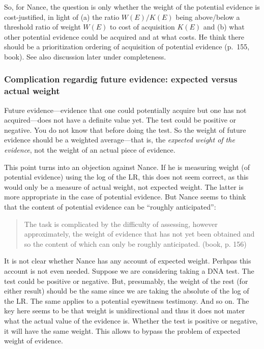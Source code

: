 \documentclass[
  10pt,
  dvipsnames,enabledeprecatedfontcommands]{scrartcl}
\begin{document}

So, for Nance, the question is only whether the weight of the potential
evidence is cost-justified, in light of (a) the ratio \(W(E)/K(E)\)
being above/below a threshold ratio of weight \(W(E)\) to cost of
acquisition \(K(E)\) and (b) what other potential evidence could be
acquired and at what costs. He think there should be a prioritization
ordering of acquisition of potential evidence (p.~155, book). See also
discussion later under completeness.

\hypertarget{complication-regardig-future-evidence-expected-versus-actual-weight}{%
\subsubsection{Complication regardig future evidence: expected versus
actual
weight}\label{complication-regardig-future-evidence-expected-versus-actual-weight}}

Future evidence---evidence that one could potentially acquire but one
has not acquired---does not have a definite value yet. The test could be
positive or negative. You do not know that before doing the test. So the
weight of future evidence should be a weighted average---that is, the
\textit{expected weight of the evidence}, not the weight of an actual
piece of evidence.

This point turns into an objection against Nance. If he is measuring
weight (of potential evidence) using the log of the LR, this does not
seem correct, as this would only be a measure of actual weight, not
expected weight. The latter is more appropriate in the case of potential
evidence. But Nance seems to think that the content of potential
evidence can be ``roughly anticipated'':

\begin{quote}
The task is complicated by the difficulty of assessing, however approximately, the weight of evidence that has not yet been obtained and so the content of which can only be roughly anticipated. (book, p. 156)
\end{quote}

It is not clear whether Nance has any account of expected weight.
Perhpas this account is not even needed. Suppose we are considering
taking a DNA test. The test could be positive or negative. But,
presumably, the weight of the rest (for either result) should be the
same since we are taking the absolute of the log of the LR. The same
applies to a potential eyewitness testimony. And so on. The key here
seems to be that weight is unidirectional and thus it does not mater
what the actual value of the evidence is. Whether the test is positive
or negative, it will have the same weight. This allows to bypass the
problem of expected weight of
evidence.
\end{document}
